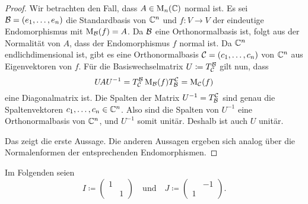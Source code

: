 \documentclass[a4paper, 10pt, numbers=noenddot]{scrartcl}
\begin{document}
\begin{proof}
  Wir betrachten den Fall, dass $A \in \operatorname{M}_n(\mathbb{C})$ normal ist.
  Es sei $\mathcal{B} = (e_1, \dotsc, e_n)$ die Standardbasis von $\mathbb{C}^n$ und $f \colon V \to V$ der eindeutige Endomorphismus mit $\operatorname{M}_{\mathcal{B}}(f) = A$.
  Da $\mathcal{B}$ eine Orthonormalbasis ist, folgt aus der Normalität von $A$, dass der Endomorphismus $f$ normal ist.
  Da $\mathbb{C}^n$ endlichdimensional ist, gibt es eine Orthonormalbasis $\mathcal{C} = (c_1, \dotsc, c_n)$ von $\mathbb{C}^n$ aus Eigenvektoren von $f$.
  Für die Basiswechselmatrix $U \coloneqq T^{\mathcal{B}}_{\mathcal{C}}$ gilt nun, dass
  \[
      U \! A U^{-1}
    = T^{\mathcal{B}}_{\mathcal{C}} \operatorname{M}_{\mathcal{B}}(f) T^{\mathcal{C}}_{\mathcal{B}}
    = \operatorname{M}_{\mathcal{C}}(f)
  \]
  eine Diagonalmatrix ist.
  Die Spalten der Matrix $U^{-1} = T^{\mathcal{C}}_{\mathcal{B}}$ sind genau die Spaltenvektoren $c_1, \dotsc, c_n \in \mathbb{C}^n$.
  Also sind die Spalten von $U^{-1}$ eine Orthonormalbasis von $\mathbb{C}^n$, und $U^{-1}$ somit unitär.
  Deshalb ist auch $U$ unitär.
  
  Das zeigt die erste Aussage.
  Die anderen Aussagen ergeben sich analog über die Normalenformen der entsprechenden Endomorphismen.
\end{proof}


Im Folgenden seien
\[
  I \coloneqq
  \begin{pmatrix}
    1 &   \\
      & 1
  \end{pmatrix}
  \quad\text{und}\quad
  J \coloneqq
  \begin{pmatrix}
      & -1  \\
    1 & 
  \end{pmatrix}.
\]
\end{document}
